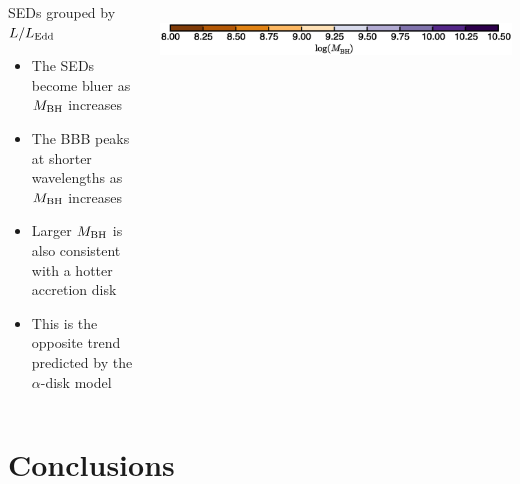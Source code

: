 \documentclass[landscape,9pt]{beamer}
\begin{document}
\begin{frame}
	\begin{columns}
	\begin{column}{.35\textwidth}
		\begin{block}{SEDs grouped by $L/L_{\rm Edd}$}
		\begin{itemize}
			\item The SEDs become bluer as $M_{\rm BH}$ increases
			\item The BBB peaks at shorter wavelengths as $M_{\rm BH}$ increases
			\item Larger $M_{\rm BH}$ is also consistent with a hotter accretion disk
			\item This is the opposite trend predicted by the $\alpha$-disk model
		\end{itemize}
		\end{block}
	\end{column}
	\begin{column}{.75\textwidth}
		\\
		\hspace{3mm}\includegraphics[width=.95\textwidth]{../images/BH/M_colorbar}
	\end{column}
	\end{columns}
\end{frame}

\section{Conclusions}
\end{document}
